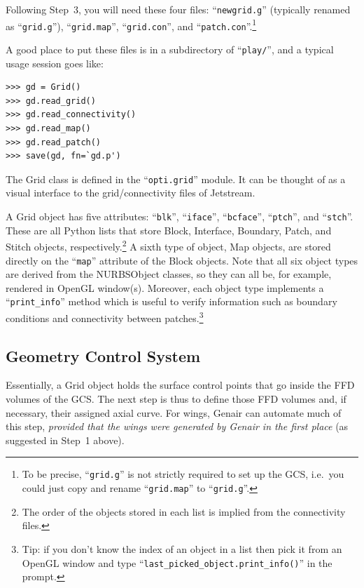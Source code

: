 \documentclass[]{article}
\begin{document}
Following Step~3, you will need these four files: ``\texttt{newgrid.g}'' 
(typically renamed as ``\texttt{grid.g}''), ``\texttt{grid.map}'', 
``\texttt{grid.con}'', and ``\texttt{patch.con}''.\footnote{To be 
precise, ``\texttt{grid.g}'' is not strictly required to set up the GCS, 
i.e.\ you could just copy and rename ``\texttt{grid.map}'' to 
``\texttt{grid.g}''.}

A good place to put these files is in a subdirectory of 
``\texttt{play/}'', and a typical usage session goes like:
\begin{verbatim}
>>> gd = Grid()
>>> gd.read_grid()
>>> gd.read_connectivity()
>>> gd.read_map()
>>> gd.read_patch()
>>> save(gd, fn=`gd.p')
\end{verbatim}

The Grid class is defined in the ``\texttt{opti.grid}'' module.  It can 
be thought of as a visual interface to the grid/connectivity files of 
Jetstream.

A Grid object has five attributes: ``\texttt{blk}'', ``\texttt{iface}'', 
``\texttt{bcface}'', ``\texttt{ptch}'', and ``\texttt{stch}''.  These 
are all Python lists that store Block, Interface, Boundary, Patch, and 
Stitch objects, respectively.\footnote{The order of the objects stored 
in each list is implied from the connectivity files.}  A sixth type of 
object, Map objects, are stored directly on the ``\texttt{map}'' 
attribute of the Block objects.  Note that all six object types are 
derived from the NURBSObject classes, so they can all be, for example, 
rendered in OpenGL window(s).  Moreover, each object type implements a 
``\texttt{print\_info}'' method which is useful to verify information 
such as boundary conditions and connectivity between 
patches.\footnote{Tip: if you don't know the index of an object in a 
list then pick it from an OpenGL window and type 
``\texttt{last\_picked\_object.print\_info()}'' in the prompt.}

\subsection{Geometry Control System}

Essentially, a Grid object holds the surface control points that go 
inside the FFD volumes of the GCS.  The next step is thus to define 
those FFD volumes and, if necessary, their assigned axial curve.  For 
wings, Genair can automate much of this step, \emph{provided that the 
wings were generated by Genair in the first place} (as suggested in 
Step~1 above).
\end{document}
